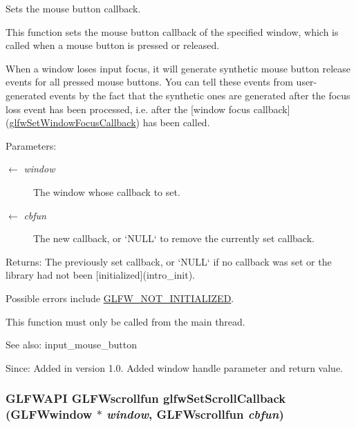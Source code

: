 Sets the mouse button callback. 

This function sets the mouse button callback of the specified window, which is called when a mouse button is pressed or released.

When a window loses input focus, it will generate synthetic mouse button release events for all pressed mouse buttons. You can tell these events from user-generated events by the fact that the synthetic ones are generated after the focus loss event has been processed, i.e. after the \mbox{[}window focus callback\mbox{]}(\hyperlink{group__window_gc89c6534ba7fbab6f6c68b855656c0d4}{glfwSetWindowFocusCallback}) has been called.

\begin{Desc}
\item[Parameters:]
\begin{description}
\item[\mbox{$\leftarrow$} {\em window}]The window whose callback to set. \item[\mbox{$\leftarrow$} {\em cbfun}]The new callback, or `NULL` to remove the currently set callback. \end{description}
\end{Desc}
\begin{Desc}
\item[Returns:]The previously set callback, or `NULL` if no callback was set or the library had not been \mbox{[}initialized\mbox{]}(intro\_\-init).\end{Desc}
Possible errors include \hyperlink{group__errors_g2374ee02c177f12e1fa76ff3ed15e14a}{GLFW\_\-NOT\_\-INITIALIZED}.

This function must only be called from the main thread.

\begin{Desc}
\item[See also:]input\_\-mouse\_\-button\end{Desc}
\begin{Desc}
\item[Since:]Added in version 1.0.  Added window handle parameter and return value. \end{Desc}
\hypertarget{group__input_g29011514e93368712a3063a28707ced3}{
\subsubsection[glfwSetScrollCallback]{\setlength{\rightskip}{0pt plus 5cm}GLFWAPI {\bf GLFWscrollfun} glfwSetScrollCallback ({\bf GLFWwindow} $\ast$ {\em window}, \/  {\bf GLFWscrollfun} {\em cbfun})}}
\label{group__input_g29011514e93368712a3063a28707ced3}


